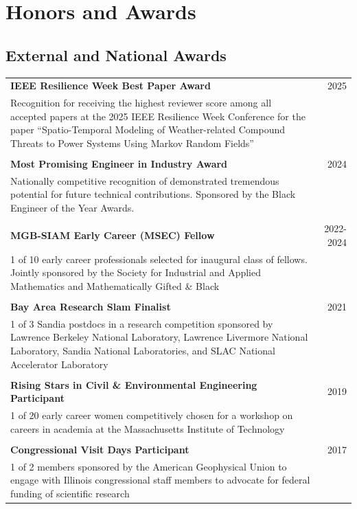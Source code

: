 \documentclass{article}[12pt]
\begin{document}
		
		\section*{Honors and Awards}
		
		
		\subsection*{External and National Awards}
		\vspace{-1em}
		
		\begin{tabularx}{\textwidth}{Xr}
			\textbf{IEEE Resilience Week Best Paper Award} & 2025 \\
			Recognition for receiving the highest reviewer score among all accepted papers at the 2025 IEEE Resilience Week Conference for the paper ``Spatio-Temporal Modeling of Weather-related Compound Threats to Power Systems Using Markov Random Fields'' \\
			\\
			\textbf{Most Promising Engineer in Industry Award}  & 2024 \\
			Nationally competitive recognition of demonstrated tremendous potential for future technical contributions. Sponsored by the Black Engineer of the Year Awards. %
			\\
			\\
			\textbf{MGB-SIAM Early Career (MSEC) Fellow} & 2022-2024 \\
			1 of 10 early career professionals selected for inaugural class of fellows. Jointly sponsored by the Society for Industrial and Applied Mathematics and Mathematically Gifted \& Black	
			\\
			\\
			\textbf{Bay Area Research Slam Finalist} & 2021 \\
			1 of 3 Sandia postdocs in a research competition sponsored by Lawrence Berkeley National Laboratory, Lawrence Livermore National Laboratory, Sandia National Laboratories, and SLAC National Accelerator Laboratory 
			\\
			\\
			\textbf{Rising Stars in Civil \& Environmental Engineering Participant} & 2019 \\
			1 of 20 early career women competitively chosen for a workshop on careers in academia at the Massachusetts Institute of Technology
			\\
			\\ %
			\textbf{Congressional Visit Days Participant} & 2017 \\
			1 of 2 members sponsored by the American Geophysical Union to engage with Illinois congressional staff members to advocate for federal funding of scientific research 
		\end{tabularx}
		
\end{document}
